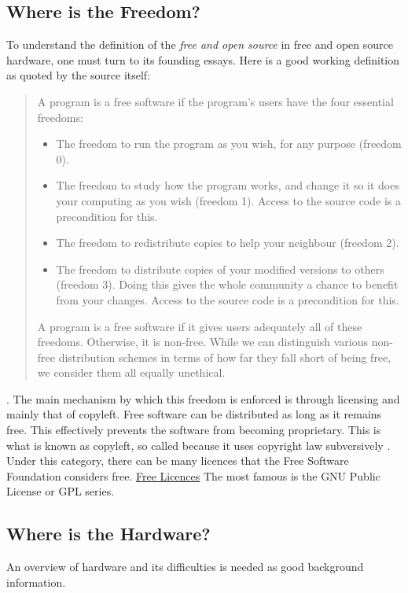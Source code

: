 \documentclass[acmtog]{acmart}
\begin{document}
\subsection{Where is the Freedom?}

To understand the definition of the \textit{free and open source} in free and open source hardware, one must turn to its founding essays. Here is a good working definition as quoted by the source itself:

\begin{quote}
    A program is a free software if the program’s users have the four essential freedoms:

    \begin{itemize}
        \item The freedom to run the program as you wish, for any purpose (freedom 0).
        \item The freedom to study how the program works, and change it so it does your computing as you wish (freedom 1). 
            Access to the source code is a precondition for this.
        \item The freedom to redistribute copies to help your neighbour (freedom 2).
        \item The freedom to distribute copies of your modified versions to others (freedom 3). 
            Doing this gives the whole community a chance to benefit from your changes. Access to the source code is a precondition for this.
    \end{itemize}
    A program is a free software if it gives users adequately all of these freedoms. Otherwise, it is non-free. 
    While we can distinguish various non-free distribution schemes in terms of how far they fall short of being free, we consider them all equally unethical.
\end{quote} \cite{b0_stallman}.
The main mechanism by which this freedom is enforced is through licensing and mainly that of copyleft. 
Free software can be distributed as long as it remains free. 
This effectively prevents the software from becoming proprietary. 
This is what is known as copyleft, so called because it uses copyright law subversively \cite{b0_stallman}.
Under this category, there can be many licences that the Free Software Foundation considers free.
\href{https://www.gnu.org/licenses/license-list.html}{Free Licences}
The most famous is the GNU Public License or GPL series.

\subsection{Where is the Hardware?}
An overview of hardware and its difficulties is needed as good background information. 
\end{document}
